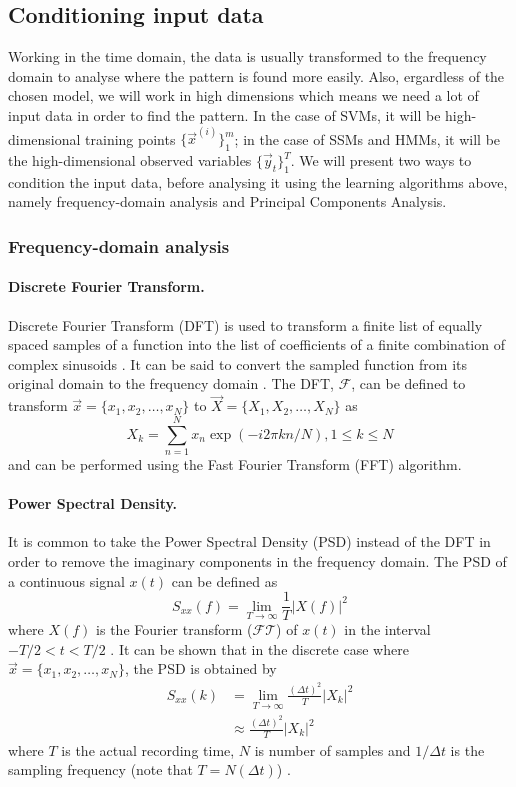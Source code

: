 \subsection{Conditioning input data}
	Working in the time domain, the data is usually transformed to the frequency domain to analyse where the pattern is found more easily. Also, ergardless of the chosen model, we will work in high dimensions which means we need a lot of input data in order to find the pattern. In the case of SVMs, it will be high-dimensional training points $\{\vec x^{(i)}\}_1^m$; in the case of SSMs and HMMs, it will be the high-dimensional observed variables $\{\vec y_t\}_1^T$. We will present two ways to condition the input data, before analysing it using the learning algorithms above, namely frequency-domain analysis and Principal Components Analysis.
	
	\subsubsection{Frequency-domain analysis}
		\paragraph{Discrete Fourier Transform.}
			Discrete Fourier Transform (DFT) is used to transform a finite list of equally spaced samples of a function into the list of coefficients of a finite combination of complex sinusoids \cite{wiki:DFT}. It can be said to convert the sampled function from its original domain to the frequency domain \cite{wiki:DFT}. The DFT, $\mathcal{F}$, can be defined to transform $\vec x = \{x_1, x_2, \dotsc, x_{N}\}$ to $\vec X = \{X_1, X_2, \dotsc, X_{N}\}$ as
			\begin{equation}
				X_k = \sum_{n = 1}^{N} x_n \exp{(-i2\pi k n / N)}, 1 \leq k \leq N
			\end{equation}
			and can be performed using the Fast Fourier Transform (FFT) algorithm.

		\paragraph{Power Spectral Density.}
			It is common to take the Power Spectral Density (PSD) instead of the DFT in order to remove the imaginary components in the frequency domain. The PSD of a continuous signal $x(t)$ can be defined as
			\begin{equation}
				S_{xx}(f) = \lim_{T \to \infty} \frac{1}{T} \left| X(f) \right|^2
			\end{equation}
			where $X(f)$ is the Fourier transform ($\mathcal{FT}$) of $x(t)$ in the interval $-T / 2 < t < T / 2$ \cite{hlt}. It can be shown that in the discrete case where $\vec x = \{x_1, x_2, \dotsc, x_{N}\}$, the PSD is obtained by
			\begin{align}
				S_{xx}(k) 	&= \lim_{T \to \infty} \frac{(\Delta t)^2}{T} |X_k|^2\\
							&\approx \frac{(\Delta t)^2}{T} |X_k|^2
			\end{align}
			where $T$ is the actual recording time, $N$ is number of samples and $1/\Delta t$ is the sampling frequency (note that $T = N(\Delta t)$) \cite{wiki:PSD}.

